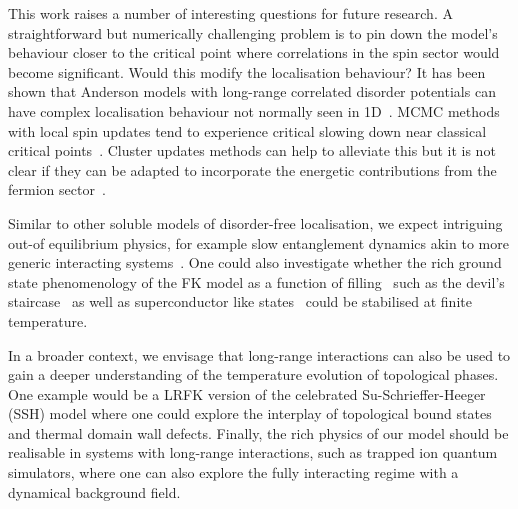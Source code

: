 This work raises a number of interesting questions for future research. A straightforward but numerically challenging problem is to pin down the model's behaviour closer to the critical point where correlations in the spin sector would become significant. Would this modify the localisation behaviour? It has been shown that Anderson models with long-range correlated disorder potentials can have complex localisation behaviour not normally seen in 1D~\autocite{aubryAnalyticityBreakingAnderson1980,shimasakiAnomalousLocalizationMultifractality2022}. MCMC methods with local spin updates tend to experience critical slowing down near classical critical points~\autocite{geyerPracticalMarkovChain1992,levinMarkovChainsMixing2017,vatsMultivariateOutputAnalysis2015}. Cluster updates methods can help to alleviate this but it is not clear if they can be adapted to incorporate the energetic contributions from the fermion sector~\autocite{evertzClusterAlgorithmVertex1993,fukuiOrderNClusterMonte2009,wolffCollectiveMonteCarlo1989}.

Similar to other soluble models of disorder-free localisation, we expect intriguing out-of equilibrium physics, for example slow entanglement dynamics akin to more generic interacting systems~\autocite{hartLogarithmicEntanglementGrowth2020}. One could also investigate whether the rich ground state phenomenology of the FK model as a function of filling~\autocite{gruberGroundStatesSpinless1990} such as the devil's staircase~\autocite{michelettiCompleteDevilTextquotesingles1997} as well as superconductor like states~\autocite{caiVisualizingEvolutionMott2016} could be stabilised at finite temperature.

In a broader context, we envisage that long-range interactions can also be used to gain a deeper understanding of the temperature evolution of topological phases. One example would be a LRFK version of the celebrated Su-Schrieffer-Heeger (SSH) model where one could explore the interplay of topological bound states and thermal domain wall defects. Finally, the rich physics of our model should be realisable in systems with long-range interactions, such as trapped ion quantum simulators, where one can also explore the fully interacting regime with a dynamical background field.
